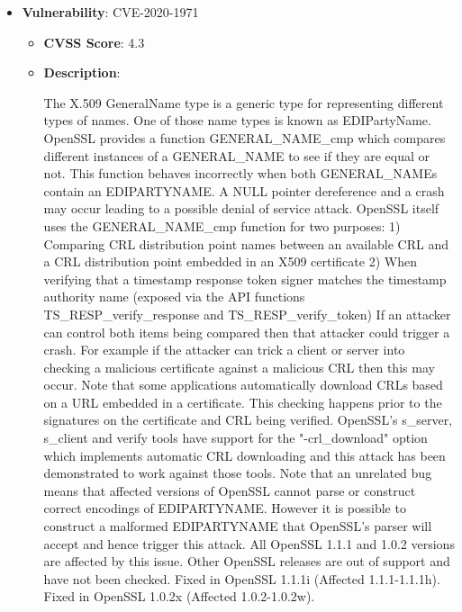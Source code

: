\documentclass{article}
\begin{document}
\begin{itemize}
        \item \textbf{Vulnerability}: CVE-2020-1971
        \begin{itemize}
            \item \textbf{CVSS Score}:  4.3 
            \item \textbf{Description}:
            \parbox[t]{0.9\linewidth}{
                \ttfamily The X.509 GeneralName type is a generic type for representing different types of names. One of those name types is known as EDIPartyName. OpenSSL provides a function GENERAL\_NAME\_cmp which compares different instances of a GENERAL\_NAME to see if they are equal or not. This function behaves incorrectly when both GENERAL\_NAMEs contain an EDIPARTYNAME. A NULL pointer dereference and a crash may occur leading to a possible denial of service attack. OpenSSL itself uses the GENERAL\_NAME\_cmp function for two purposes: 1) Comparing CRL distribution point names between an available CRL and a CRL distribution point embedded in an X509 certificate 2) When verifying that a timestamp response token signer matches the timestamp authority name (exposed via the API functions TS\_RESP\_verify\_response and TS\_RESP\_verify\_token) If an attacker can control both items being compared then that attacker could trigger a crash. For example if the attacker can trick a client or server into checking a malicious certificate against a malicious CRL then this may occur. Note that some applications automatically download CRLs based on a URL embedded in a certificate. This checking happens prior to the signatures on the certificate and CRL being verified. OpenSSL's s\_server, s\_client and verify tools have support for the "-crl\_download" option which implements automatic CRL downloading and this attack has been demonstrated to work against those tools. Note that an unrelated bug means that affected versions of OpenSSL cannot parse or construct correct encodings of EDIPARTYNAME. However it is possible to construct a malformed EDIPARTYNAME that OpenSSL's parser will accept and hence trigger this attack. All OpenSSL 1.1.1 and 1.0.2 versions are affected by this issue. Other OpenSSL releases are out of support and have not been checked. Fixed in OpenSSL 1.1.1i (Affected 1.1.1-1.1.1h). Fixed in OpenSSL 1.0.2x (Affected 1.0.2-1.0.2w).
            }
        \end{itemize}
    

\end{itemize}
\end{document}
